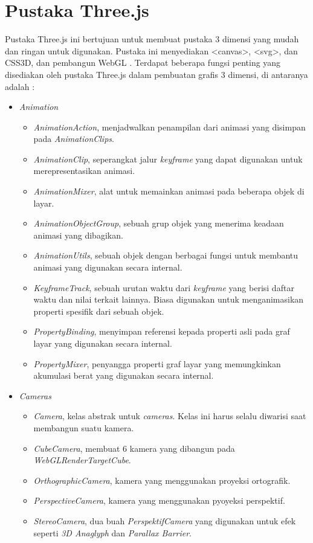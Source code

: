 \section{Pustaka Three.js}
\label{sec:latex}
Pustaka Three.js ini bertujuan untuk membuat pustaka 3 dimensi yang mudah dan ringan untuk digunakan. Pustaka ini menyediakan <canvas>, <svg>, dan CSS3D, dan pembangun WebGL \cite{githubthreejs}.
Terdapat beberapa fungsi penting yang disediakan oleh pustaka Three.js dalam pembuatan grafis 3 dimensi, di antaranya adalah \cite{threejs}:
\begin{itemize}

\item \textit{Animation}

	\begin{itemize}
	\item {\it AnimationAction}, menjadwalkan penampilan dari animasi yang disimpan pada {\it AnimationClips}.
	\item {\it AnimationClip}, seperangkat jalur {\it keyframe} yang dapat digunakan untuk merepresentasikan animasi.
	\item {\it AnimationMixer}, alat untuk memainkan animasi pada beberapa objek di layar.
	\item {\it AnimationObjectGroup}, sebuah grup objek yang menerima keadaan animasi yang dibagikan.
	\item {\it AnimationUtils}, sebuah objek dengan berbagai fungsi untuk membantu animasi yang digunakan secara internal.
	\item {\it KeyframeTrack}, sebuah urutan waktu dari {\it keyframe} yang berisi daftar waktu dan nilai terkait lainnya. Biasa digunakan untuk menganimasikan properti spesifik dari sebuah objek.
	\item {\it PropertyBinding}, menyimpan referensi kepada properti asli pada graf layar yang digunakan secara internal.
	\item {\it PropertyMixer}, penyangga properti graf layar yang memungkinkan akumulasi berat yang digunakan secara internal.
	\end{itemize}

\item \textit{Cameras}

	\begin{itemize}
	\item {\it Camera}, kelas abstrak untuk {\it cameras}. Kelas ini harus selalu diwarisi saat membangun suatu kamera.
	\item {\it CubeCamera}, membuat 6 kamera yang dibangun pada {\it WebGLRenderTargetCube}.
	\item{\it OrthographicCamera}, kamera yang menggunakan proyeksi ortografik.
	\item {\it PerspectiveCamera}, kamera yang menggunakan pyoyeksi perspektif.
	\item {\it StereoCamera}, dua buah {\it PerspektifCamera} yang digunakan untuk efek seperti {\it 3D Anaglyph} dan {\it Parallax Barrier}.
	\end{itemize}
	

\end{itemize}
